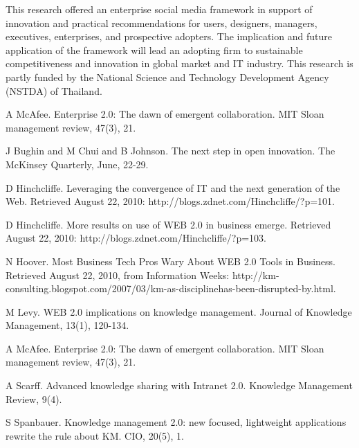 \documentclass[article, A4, 11pt]{llncs}%
\begin{document}
This research offered an enterprise social media framework in support of innovation and practical recommendations for users, designers, managers, executives, enterprises, and prospective adopters. The implication and future application of the framework will lead an adopting firm to sustainable competitiveness and innovation in global market and IT industry. This research is partly funded by the National Science and Technology Development Agency (NSTDA) of Thailand.



\begin{thebibliography}{10}
{\sc A McAfee}. {Enterprise 2.0: The dawn of emergent collaboration}. MIT Sloan management review, 47(3), 21.

{\sc J Bughin and M Chui and B Johnson}. {The next step in open innovation}. The McKinsey Quarterly, June, 22-29.

{\sc D Hinchcliffe}. {Leveraging the convergence of IT and the next generation of the Web}. Retrieved August 22, 2010: http://blogs.zdnet.com/Hinchcliffe/?p=101.

{\sc D Hinchcliffe}. {More results on use of WEB 2.0 in business emerge}. Retrieved August 22, 2010: http://blogs.zdnet.com/Hinchcliffe/?p=103.

{\sc N Hoover}. {Most Business Tech Pros Wary About WEB 2.0 Tools in Business}. Retrieved August 22, 2010, from Information Weeks: http://km-consulting.blogspot.com/2007/03/km-as-disciplinehas-been-disrupted-by.html.

{\sc M Levy}. {WEB 2.0 implications on knowledge management}. Journal of Knowledge Management, 13(1), 120-134.

{\sc A McAfee}. {Enterprise 2.0: The dawn of emergent collaboration}. MIT Sloan management review, 47(3), 21.

{\sc A Scarff}. {Advanced knowledge sharing with Intranet 2.0}. Knowledge Management Review, 9(4).

{\sc S Spanbauer}. {Knowledge management 2.0: new focused, lightweight applications rewrite the rule about KM}. CIO, 20(5), 1.
\end{thebibliography} %
\end{document}
